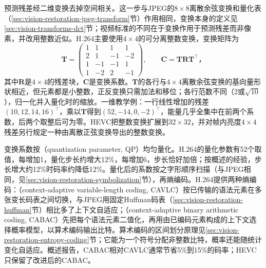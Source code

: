 预测残差经二维变换去掉空间相关。这一步与JPEG的$8\times8$离散余弦变换和量化表（\ref{sec:vision-restoration-jpeg-transform}节）作用相同，变换本身的定义见\ref{sec:vision-transforms-dct}节；视频标准的不同在于变换作用于预测残差而非像素，并改用整数近似。H.264主要使用$4\times4$的可分离整数变换，变换矩阵为
\begin{equation}
  \bm{T}=\begin{pmatrix}
    1&1&1&1\\
    2&1&-1&-2\\
    1&-1&-1&1\\
    1&-2&2&-1
  \end{pmatrix},\qquad
  \bm{C}=\bm{T}\bm{R}\bm{T}^{\top}\text{，}
  \label{eq:vision-video-h264-transform}
\end{equation}
其中$\bm{R}$是$4\times4$的残差块，$\bm{C}$是变换系数。$\bm{T}$的各行与$4\times4$离散余弦变换的基向量形状相近，但元素都是小整数，正反变换只需加法和移位；各行范数不同（2或$\sqrt{10}$），归一化并入量化时的缩放。一维教学例：一行线性增加的残差$(10,12,14,16)^\top$，乘以$\bm{T}$得到$(52,-14,0,-2)^\top$，能量几乎全集中在前两个系数，后两个取整后可为零。HEVC把整数变换扩展到$32\times32$，并对帧内亮度$4\times4$残差另行规定一种由离散正弦变换导出的整数变换。

变换系数按（quantization parameter, QP）均匀量化。H.264的量化参数有52个取值，每增加1，量化步长约增大12\%，每增加6，步长恰好加倍；按概述的经验，步长增大约12\%时码率约降低12\%。量化后的系数按之字形顺序扫描（与JPEG相同，见\ref{sec:vision-restoration-symbolization}节），再熵编码。H.264提供两种熵编码：（context-adaptive variable-length coding, CAVLC）按已传输的语法元素在多张变长码表之间切换，与JPEG用固定Huffman码表（\ref{sec:vision-restoration-huffman}节）相比多了上下文自适应；（context-adaptive binary arithmetic coding, CABAC）先把每个语法元素二值化，再用由已编码元素构成的上下文选择概率模型，以算术编码输出比特。算术编码的区间划分原理见\ref{sec:vision-restoration-entropy-coding}节；它能为一个符号分配非整数比特，概率还能随统计变化自适应。概述报告，CABAC相对CAVLC通常节省5\%到15\%的码率；HEVC只保留了改进后的CABAC。

